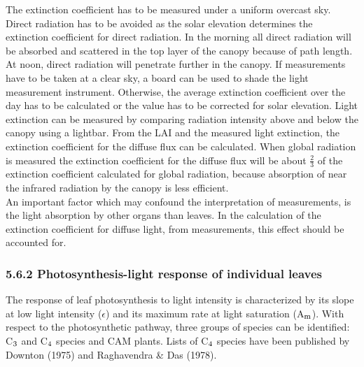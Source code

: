 \documentclass[11pt]{article}
\begin{document}
\bigskip
\bigskip
\bigskip
\bigskip
The extinction coefficient has to be measured under a uniform overcast sky. Direct
radiation has to be avoided as the solar elevation determines the extinction coeffi\-cient for
direct radiation. In the morning all direct radiation will be absorbed and scattered in the
top layer of the canopy because of path length. At noon, direct radiation will penetrate
further in the canopy. If measurements have to be taken at a clear sky, a board can be
used to shade the light measure\-ment instrument. Otherwise, the average extinction
coefficient over the day has to be calculated or the value has to be corrected for solar
elevation. Light extinction can be measured by comparing radiation intensity above and
below the canopy using a lightbar. From the LAI and the measured light extinction, the
extinction coefficient for the diffuse flux can be calculated. When global radiation is
measured the extinction coefficient for the diffuse flux will be about $\frac{2}{3}$ of the extinction
coefficient calculated for global radia\-tion, because absorption of near the infrared
radiation by the canopy is less efficient.\\
An important factor which may confound the interpretation of measurements, is the light
absorption by other organs than leaves. In the calculation of the extinction coefficient for
diffuse light, from measurements, this effect should be accounted for.

\bigskip
\bigskip

\subsubsection{  5.6.2 Photosynthesis-light response of individual leaves  } 

The response of leaf photosynthesis to light intensity is characterized by its slope at low
light intensity ($\epsilon$) and its maximum rate at light saturation (A$_{{\rm m}}$). With respect to the
photosynthetic pathway, three groups of species can be identified: C$_{{\rm 3}}$ and C$_{{\rm 4}}$ species and
CAM plants. Lists of C$_{{\rm 4}}$ species have been published by Downton (1975) and
{\nobreak}Raghavendra \& Das (1978).   
\end{document}
